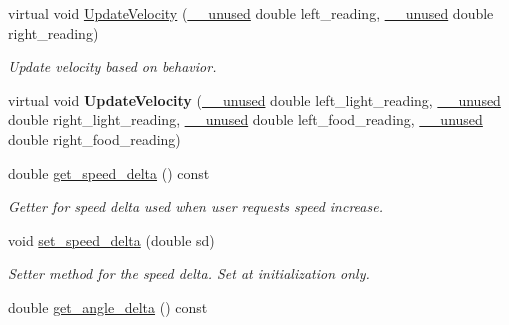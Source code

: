 \begin{DoxyCompactItemize}
virtual void \mbox{\hyperlink{class_motion_handler_a1f2d27b1f7032c40b72a50757146722d}{Update\+Velocity}} (\mbox{\hyperlink{common_8h_a2e3484535ee610c8e19e9859563abe48}{\+\_\+\+\_\+unused}} double left\+\_\+reading, \mbox{\hyperlink{common_8h_a2e3484535ee610c8e19e9859563abe48}{\+\_\+\+\_\+unused}} double right\+\_\+reading)
\begin{DoxyCompactList}\small\item\em Update velocity based on behavior. \end{DoxyCompactList}\item 
\mbox{\label{class_motion_handler_adcd31df93aaad96ffd8d59aa342c7aff}} 
virtual void {\bfseries Update\+Velocity} (\mbox{\hyperlink{common_8h_a2e3484535ee610c8e19e9859563abe48}{\+\_\+\+\_\+unused}} double left\+\_\+light\+\_\+reading, \mbox{\hyperlink{common_8h_a2e3484535ee610c8e19e9859563abe48}{\+\_\+\+\_\+unused}} double right\+\_\+light\+\_\+reading, \mbox{\hyperlink{common_8h_a2e3484535ee610c8e19e9859563abe48}{\+\_\+\+\_\+unused}} double left\+\_\+food\+\_\+reading, \mbox{\hyperlink{common_8h_a2e3484535ee610c8e19e9859563abe48}{\+\_\+\+\_\+unused}} double right\+\_\+food\+\_\+reading)
\item 
\mbox{\label{class_motion_handler_ada53f0d6e25d759fc3f45cc55d440177}} 
double \mbox{\hyperlink{class_motion_handler_ada53f0d6e25d759fc3f45cc55d440177}{get\+\_\+speed\+\_\+delta}} () const
\begin{DoxyCompactList}\small\item\em Getter for speed delta used when user requests speed increase. \end{DoxyCompactList}\item 
\mbox{\label{class_motion_handler_a908b330346b3fe969684106bd5c7619d}} 
void \mbox{\hyperlink{class_motion_handler_a908b330346b3fe969684106bd5c7619d}{set\+\_\+speed\+\_\+delta}} (double sd)
\begin{DoxyCompactList}\small\item\em Setter method for the speed delta. Set at initialization only. \end{DoxyCompactList}\item 
\mbox{\label{class_motion_handler_aa5ec33068c516234a6521de356b08d68}} 
double \mbox{\hyperlink{class_motion_handler_aa5ec33068c516234a6521de356b08d68}{get\+\_\+angle\+\_\+delta}} () const

\end{DoxyCompactItemize}
